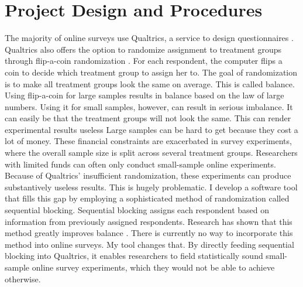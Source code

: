 \documentclass[11pt]{article}
\begin{document}
\section{Project Design and Procedures}

\vspace{0.3cm}

The majority of online surveys use Qualtrics, a service to design questionnaires \citep{boas_fielding_2013}. Qualtrics also offers the option to randomize assignment to treatment groups through flip-a-coin randomization \citep{urdan_statistics_2010}. For each respondent, the computer flips a coin to decide which treatment group to assign her to. The goal of randomization is to make all treatment groups look the same on average. This is called balance. Using flip-a-coin for large samples results in balance based on the law of large numbers. Using it for small samples, however, can result in serious imbalance. It can easily be that the treatment groups will not look the same. This can render experimental results useless \citep{imai_quantitative_2018,king_designing_1994,fox_applied_2015} Large samples can be hard to get because they cost a lot of money. These financial constraints are exacerbated in survey experiments, where the overall sample size is split across several treatment groups. Researchers with limited funds can often only conduct small-sample online experiments. Because of Qualtrics' insufficient randomization, these experiments can produce substantively useless results. This is hugely problematic. I develop a software tool that fills this gap by employing a sophisticated method of randomization called sequential blocking. Sequential blocking assigns each respondent based on information from previously assigned respondents. Research has shown that this method greatly improves balance \citep{moore_blocking_2013}. There is currently no way to incorporate this method into online surveys. My tool changes that. By directly feeding sequential blocking into Qualtrics, it enables researchers to field statistically sound small-sample online survey experiments, which they would not be able to achieve otherwise.
\end{document}

